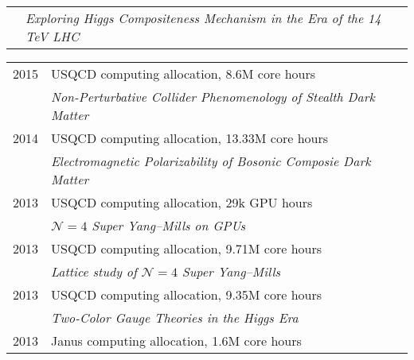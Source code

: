 \begin{spacelistout}
\begin{tabular}[t]{cl}
           & \textit{Exploring Higgs Compositeness Mechanism in the Era of the 14 TeV LHC}                                                                     \\[6 pt]
    \end{tabular} %
    \begin{tabular}[t]{cl}
      2015 & USQCD computing allocation, 8.6M core hours                                                                                                       \\ %
           & \textit{Non-Perturbative Collider Phenomenology of Stealth Dark Matter}                                                                           \\[6 pt]
      2014 & USQCD computing allocation, 13.33M core hours                                                                                                     \\ %
           & \textit{Electromagnetic Polarizability of Bosonic Composie Dark Matter}                                                                           \\[6 pt]
      2013 & USQCD computing allocation, 29k GPU hours                                                                                                         \\ %
           & \textit{$\mathcal N = 4$ Super Yang--Mills on GPUs}                                                                                               \\[6 pt]
      2013 & USQCD computing allocation, 9.71M core hours                                                                                                      \\ %
           & \textit{Lattice study of $\mathcal N = 4$ Super Yang--Mills}                                                                                      \\[6 pt]
      2013 & USQCD computing allocation, 9.35M core hours                                                                                                      \\ %
           & \textit{Two-Color Gauge Theories in the Higgs Era}                                                                                                \\[6 pt]
      2013 & Janus computing allocation, 1.6M core hours                                                                                                       \\ %

\end{tabular}
\end{spacelistout}
